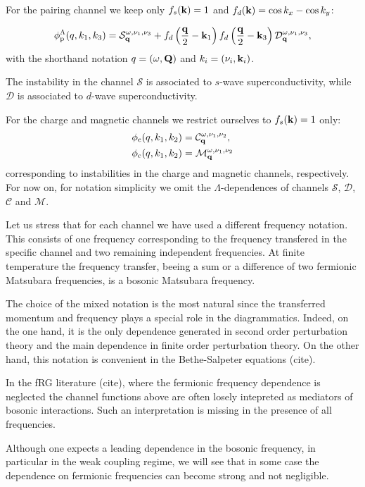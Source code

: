 For the pairing channel we keep only $f_{s}(\mathbf{k}) = 1$ and $f_d(\mathbf{k})=\cos{k_x} - \cos{k_y}$:

\begin{equation}
  \phi^{\Lambda}_{\mathrm{p}}(q,k_1,k_3) =
    \mathcal{S}_{\mathbf{q}}^{\omega,\nu_1,\nu_3} 
    + f_d\left(\frac{\mathbf{q}}{2}-\mathbf{k}_1\right) f_d\left(\frac{\mathbf{q}}{2}-\mathbf{k}_3\right) \mathcal{D}_{\mathbf{q}}^{\omega,\nu_1,\nu_3},
\end{equation}
with the shorthand notation $q=(\omega,\mathbf{Q})$ and $k_i=(\nu_i,\mathbf{k}_i)$.

The instability in the channel $\mathcal{S}$ is associated to $s$-wave superconductivity, while $\mathcal{D}$ 
is associated to $d$-wave superconductivity.

For the charge and magnetic channels we restrict ourselves to $f_{s}(\mathbf{k})=1$ only:
\begin{align}
  \phi_{\mathrm{c}}(q,k_1,k_2) &= \mathcal{C}_{\mathbf{q}}^{\omega,\nu_1,\nu_2}, \\
  \phi_{\mathrm{c}}(q,k_1,k_2) &= \mathcal{M}_{\mathbf{q}}^{\omega,\nu_1,\nu_2}
\end{align}
corresponding to instabilities in the charge and magnetic channels, respectively. For now on, for notation simplicity we omit 
the $\Lambda$-dependences of channels $\mathcal{S}$, $\mathcal{D}$, $\mathcal{C}$ and $\mathcal{M}$.

Let us stress that for each channel we have used a different frequency notation.
This consists of one frequency corresponding to the frequency transfered in the specific channel 
and two remaining independent frequencies. At finite temperature the frequency transfer, beeing a sum or a difference of 
two fermionic Matsubara frequencies, is a bosonic Matsubara frequency.

\noindent
The choice of the mixed notation is the most natural since the transferred momentum and 
frequency plays a special role in the diagrammatics.
Indeed, on the one hand, it is the only dependence generated in second order perturbation theory and the main dependence in finite 
order perturbation theory. On the other hand, this notation is convenient in the Bethe-Salpeter equations (cite).

In the fRG literature (cite), where the fermionic frequency dependence is neglected the channel functions above are often losely intepreted as 
mediators of bosonic interactions. Such an interpretation is missing in the presence of all frequencies.

Although one expects a leading dependence in the bosonic frequency, 
in particular in the weak coupling regime, we will see that in some case the dependence on fermionic frequencies can become strong and not negligible.

